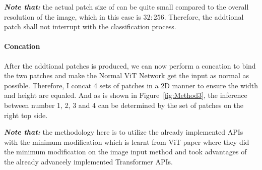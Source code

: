 \textbf{\textit{Note that: }} the actual patch size of can be quite small compared to the overall resolution of the image, which in this case is $32:256$. Therefore, the addtional patch shall not interrupt with the classification process.

\paragraph{Concation} After the addtional patches is produced, we can now perform a concation to bind the two patches and make the Normal ViT Network get the input as normal as possible. Therefore, I concat 4 sets of patches in a 2D manner to ensure the width and height are equaled. And as is shown in Figure~\ref{fig:Method3}, the inference between number 1, 2, 3 and 4 can be determined by the set of patches on the right top side.

\textbf{\textit{Note that: }} the methodology here is to utilize the already implemented APIs with the minimum modification which is learnt from ViT\cite{dosovitskiy2020image} paper where they did the minimum modification on the image input method and took advantages of the already advancely implemented Transformer APIs.





%
%
    
